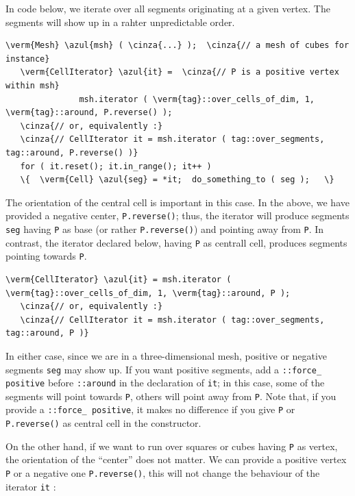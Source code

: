 In code below, we iterate over all segments originating at a given vertex.
The segments will show up in a rahter unpredictable order.

\begin{Verbatim}[commandchars=\\\{\},formatcom=\small\tt,
   baselinestretch=0.94,framesep=2mm                      ]
   \verm{Mesh} \azul{msh} ( \cinza{...} );  \cinza{// a mesh of cubes for instance}
   \verm{CellIterator} \azul{it} =  \cinza{// P is a positive vertex within msh}
               msh.iterator ( \verm{tag}::over_cells_of_dim, 1, \verm{tag}::around, P.reverse() );
   \cinza{// or, equivalently :}
   \cinza{// CellIterator it = msh.iterator ( tag::over_segments, tag::around, P.reverse() )}
   for ( it.reset(); it.in_range(); it++ )
   \{  \verm{Cell} \azul{seg} = *it;  do_something_to ( seg );   \}
\end{Verbatim}

The orientation of the central cell is important in this case.
In the above, we have provided a negative center, {\small\tt P.reverse()};
thus, the iterator will produce segments {\small\tt seg} having {\small\tt P} as base
(or rather {\small\tt P.reverse()}) and pointing away from {\small\tt P}.
In contrast, the iterator declared below, having {\small\tt P} as centrall cell,
produces segments pointing towards {\small\tt P}.

\begin{Verbatim}[commandchars=\\\{\},formatcom=\small\tt,
   baselinestretch=0.94,framesep=2mm                      ]
   \verm{CellIterator} \azul{it} = msh.iterator ( \verm{tag}::over_cells_of_dim, 1, \verm{tag}::around, P );
   \cinza{// or, equivalently :}
   \cinza{// CellIterator it = msh.iterator ( tag::over_segments, tag::around, P )}
\end{Verbatim}

In either case, since we are in a three-dimensional mesh, positive or negative segments
{\small\tt seg} may show up.
If you want positive segments, add a {\small\tt{}::force\_\,positive} before
{\small\tt{}::around} in the declaration of {\small\tt it};
in this case, some of the segments will point towards {\small\tt P},
others will point away from {\small\tt P}.
Note that, if you provide a {\small\tt{}::force\_\,positive}, it makes no difference
if you give {\small\tt P} or {\small\tt P.reverse()} as central cell in the constructor.

On the other hand, if we want to run over squares or cubes having {\small\tt P} as vertex,
the orientation of the ``center'' does not matter.
We can provide a positive vertex {\small\tt P} or a negative one {\small\tt P.reverse()},
this will not change the behaviour of the iterator {\small\tt it} :

